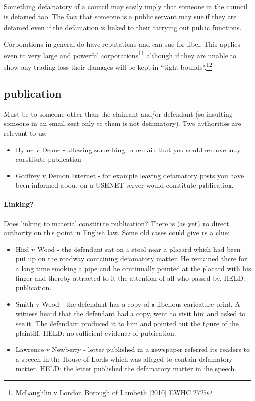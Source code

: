 \documentclass[]{article}
\begin{document}
Something defamatory of a council may easily imply that someone in the
council is defamed too. The fact that someone is a public servant may sue if they are defamed even if the defamation is linked to their carrying out public functions.\footnote{McLaughlin v London Borough of Lambeth [2010] EWHC 2726}

Corporations in general do have reputations and can sue for libel. This
applies even to very large and powerful
corporations\hyperref[sdfootnote11sym]{\textsuperscript{11}} although if
they are unable to show any trading loss their damages will be kept in
``tight bounds''.\hyperref[sdfootnote12sym]{\textsuperscript{12}}

\subsection{publication}

Must be to someone other than the claimant and/or defendant (so
insulting someone in an email sent only to them is not defamatory). Two
authorities are relevant to us:

\begin{itemize}
\item
  Byrne v Deane - allowing something to remain that you could remove may
  constitute publication
\item
  Godfrey v Demon Internet - for example leaving defamatory posts you
  have been informed about on a USENET server would constitute
  publication.
\end{itemize}

\paragraph{Linking?}

Does linking to material constitute publication? There is (as yet) no
direct authority on this point in English law. Some old cases could give
us a clue:

\begin{itemize}
\item
  Hird v Wood - the defendant sat on a stool near a placard which had
  been put up on the roadway containing defamatory matter. He remained
  there for a long time smoking a pipe and he continually pointed at the
  placard with his finger and thereby attracted to it the attention of
  all who passed by. HELD: publication.
\item
  Smith v Wood - the defendant has a copy of a libellous caricature
  print. A witness heard that the defendant had a copy, went to visit
  him and asked to see it. The defendant produced it to him and pointed
  out the figure of the plaintiff. HELD: no sufficient evidence of
  publication.
\item
  Lawrence v Newberry - letter published in a newspaper referred its
  readers to a speech in the House of Lords which was alleged to contain
  defamatory matter. HELD: the letter published the defamatory matter in
  the speech.
\end{itemize}
\end{document}
